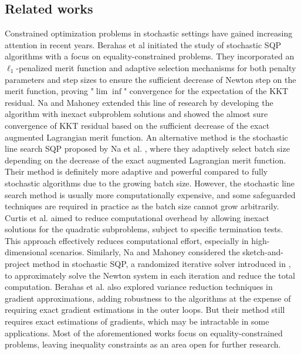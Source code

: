 \documentclass[aos]{imsart}
\numberwithin{equation}{section}
\theoremstyle{plain}
\begin{document}
\subsection{Related works}
\label{intro:related_works}
Constrained optimization problems in stochastic settings have gained increasing attention in recent years.  Berahas et al \cite{berahas2021sequential} initiated the study of stochastic SQP algorithms with a focus on equality-constrained problems.
They incorporated an $\ell_1$-penalized merit function and adaptive selection mechanisms for both penalty parameters and step sizes to ensure the sufficient decrease of Newton step on the merit function, proving "$\lim \inf$" convergence for the expectation of the KKT residual.
Na and Mahoney \cite{na2022asymptotic} extended this line of research by developing the algorithm with inexact subproblem solutions and showed the almost sure convergence of KKT residual based on the sufficient decrease of the exact augmented Lagrangian merit function. An alternative method is the stochastic line search SQP proposed by Na et al. \cite{na2023adaptive}, where they adaptively select batch size depending on the decrease of the exact augmented Lagrangian merit function. Their method is definitely more adaptive and powerful compared to fully stochastic algorithms due to the growing batch size. However, the stochastic line search method is usually more computationally expensive, and some safeguarded techniques are required in practice as the batch size cannot grow arbitrarily. 
Curtis et al. \cite{curtis2021inexact} aimed to reduce computational overhead by allowing inexact solutions for the quadratic subproblems, subject to specific termination tests. This approach effectively reduces computational effort, especially in high-dimensional scenarios.
Similarly, Na and Mahoney \cite{na2022asymptotic} considered the sketch-and-project method in stochastic SQP, a randomized iterative solver introduced in \cite{gower2015randomized}, to approximately solve the Newton system in each iteration and reduce the total computation. 
Berahas et al. \cite{berahas2023accelerating} also explored variance reduction techniques in gradient approximations, adding robustness to the algorithms at the expense of requiring exact gradient estimations in the outer loops. 
But their method still requires exact estimations of gradients, which may be intractable in some applications. 
Most of the aforementioned works focus on equality-constrained problems, leaving inequality constraints as an area open for further research.
\end{document}
